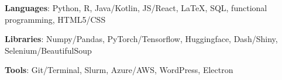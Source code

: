\textbf{Languages}: Python, R, Java/Kotlin, JS/React, \LaTeX, SQL, functional programming, HTML5/CSS\par
\textbf{Libraries}: Numpy/Pandas, PyTorch/Tensorflow, Huggingface, Dash/Shiny, Selenium/BeautifulSoup\par
\textbf{Tools}: Git/Terminal, Slurm, Azure/AWS, WordPress, Electron